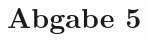 \documentclass[12pt,a4paper,bibliography=totocnumbered]{scrartcl}
\begin{document}

\pagestyle{fancy}
\renewcommand{\sectionmark}[1]{\markright{\arabic{section}.\ #1}}
\renewcommand{\leftmark}{}
\fancyhf{}
\lhead{}
\chead{}
\rhead{\thesection\space\contentsname}
\cfoot{}
\rfoot{\ \linebreak  \thepage}
\renewcommand{\headrulewidth}{0.4pt}
\renewcommand{\footrulewidth}{0.4pt}




\clearpage

\setcounter{page}{1}

\fancyhead[LE,RO]{\rightmark}
\fancyfoot[LE,RO]{\thepage}


\section*{Abgabe 5}
\end{document}
